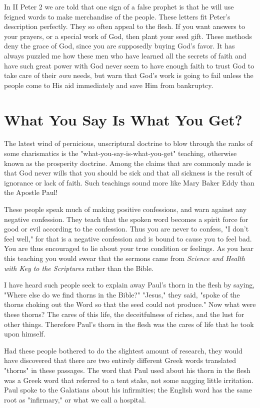 In II Peter 2 we are told that one sign of a false prophet is that he will use feigned words to make merchandise of the people. These letters fit Peter's description perfectly. They so often appeal to the flesh. If you want answers to your prayers, or a special work of God, then plant your seed gift. These methods deny the grace of God, since you are supposedly buying God's favor. It has always puzzled me how these men who have learned all the secrets of faith and have such great power with God never seem to have enough faith to trust God to take care of their \emph{own} needs, but warn that God's work is going to fail unless the people come to His aid immediately and save Him from bankruptcy. 

\section*{What You Say Is What You Get?}

The latest wind of pernicious, unscriptural doctrine to blow through the ranks of some charismatics is the "what-you-say-is-what-you-get" teaching, otherwise known as the prosperity doctrine. Among the claims that are commonly made is that God never wills that you should be sick and that all sickness is the result of ignorance or lack of faith. Such teachings sound more like Mary Baker Eddy than the Apostle Paul! 

These people speak much of making positive confessions, and warn against any negative confession. They teach that the spoken word becomes a spirit force for good or evil according to the confession. Thus you are never to confess, "I don't feel well," for that is a negative confession and is bound to cause you to feel bad. You are thus encouraged to lie about your true condition or feelings. As you hear this teaching you would swear that the sermons came from \emph{Science and Health with Key to the Scriptures} rather than the Bible. 

I have heard such people seek to explain away Paul's thorn in the flesh by saying, "Where else do we find thorns in the Bible?" "Jesus," they said, "spoke of the thorns choking out the Word so that the seed could not produce." Now what were these thorns? The cares of this life, the deceitfulness of riches, and the lust for other things. Therefore Paul's thorn in the flesh was the cares of life that he took upon himself. 

Had these people bothered to do the slightest amount of research, they would have discovered that there are two entirely different Greek words translated "thorns" in these passages. The word that Paul used about his thorn in the flesh was a Greek word that referred to a tent stake, not some nagging little irritation. Paul spoke to the Galatians about his infirmities; the English word has the same root as "infirmary," or what we call a hospital. 


